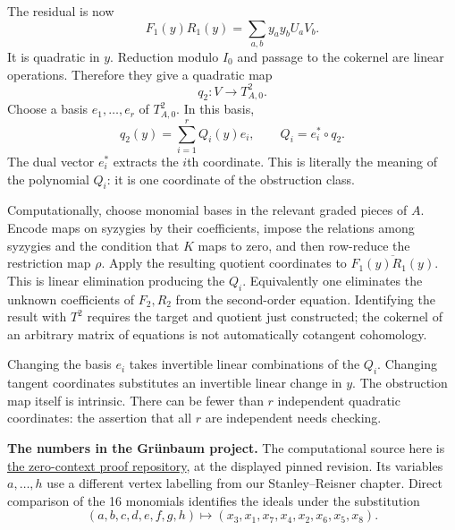 The residual is now
$$
F_1(y)R_1(y)=
\sum_{a,b}y_ay_bU_aV_b.
$$
It is quadratic in $y$. Reduction modulo
$I_0$ and passage to the cokernel are
linear operations. Therefore they give
a quadratic map
$$
q_2:V\longrightarrow T^2_{A,0}.
$$
Choose a basis $e_1,\ldots,e_r$ of
$T^2_{A,0}$. In this basis,
\begin{equation}
\label{equation-quadratic-coordinates}
q_2(y)=\sum_{i=1}^r Q_i(y)e_i,
\qquad Q_i=e_i^*\circ q_2.
\end{equation}
The dual vector $e_i^*$ extracts the
$i$th coordinate. This is literally the
meaning of the polynomial $Q_i$: it is
one coordinate of the obstruction class.

Computationally, choose monomial bases in
the relevant graded pieces of $A$. Encode
maps on syzygies by their coefficients,
impose the relations among syzygies and
the condition that $K$ maps to zero, and
then row-reduce the restriction map $\rho$.
Apply the resulting quotient coordinates
to $\overline{F_1(y)R_1(y)}$. This is
linear elimination producing the $Q_i$.
Equivalently one eliminates the unknown
coefficients of $F_2,R_2$ from the
second-order equation. Identifying the
result with $T^2$ requires the target and
quotient just constructed; the cokernel
of an arbitrary matrix of equations is
not automatically cotangent cohomology.

Changing the basis $e_i$ takes invertible
linear combinations of the $Q_i$.
Changing tangent coordinates substitutes
an invertible linear change in $y$.
The obstruction map itself is intrinsic.
There can be fewer than $r$ independent
quadratic coordinates: the assertion that
all $r$ are independent needs checking.

\medskip\noindent
\textbf{The numbers in the Gr\"unbaum
project.}
The computational source here is
\href{https://github.com/danimalabares/%
grunbaum-zero-context-proof/%
tree/%
ee984e9541e9cb9259728e6dc7b3a1bc0fda8a9b}
{the zero-context proof repository},
at the displayed pinned revision.
Its variables $a,\ldots,h$ use a different
vertex labelling from our
Stanley--Reisner chapter. Direct comparison
of the 16 monomials identifies the ideals
under the substitution
$$
(a,b,c,d,e,f,g,h)\longmapsto
(x_3,x_1,x_7,x_4,x_2,x_6,x_5,x_8).
$$

